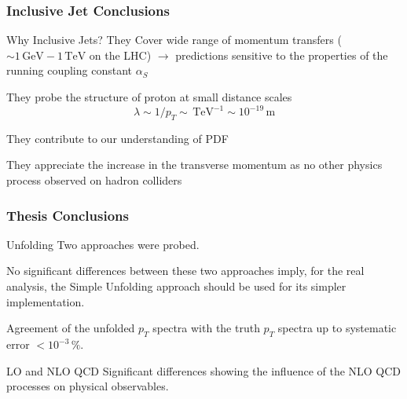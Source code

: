 \documentclass[compress]{beamer}
\newcommand{\GeV}{\,\text{GeV}}
\newcommand{\TeV}{\,\text{TeV}}
\newcommand{\pt}{p_{T}}
\begin{document}
\begin{frame}
\frametitle{Inclusive Jet Conclusions}
\begin{block}{Why Inclusive Jets?}
  They Cover wide range of momentum transfers ($\sim 1 \GeV - 1 \TeV$ on
  the LHC) $\rightarrow$ predictions sensitive to
  the properties of the running coupling constant $\alpha_S$

  They probe the structure of proton at small distance scales 
  \begin{equation*}
    \lambda \sim 1/\pt \sim \TeV^{-1} \sim 10^{-19}\,\text{m}
  \end{equation*}

  They contribute to our understanding of PDF

  They appreciate the increase in the transverse momentum as no other physics
  process observed on hadron colliders
\end{block}
\end{frame}

\begin{frame}
\frametitle{Thesis Conclusions}
\begin{block}{Unfolding}
  Two approaches were probed.
  
  No significant differences between these two approaches imply, for the real
  analysis, the Simple Unfolding approach should be used for its simpler
  implementation.

  Agreement of the unfolded $\pt$ spectra with the truth $\pt$ spectra up to
  systematic error $<10^{-3}\,\%$.
\end{block}
\begin{block}{LO and NLO QCD}
  Significant differences showing the influence of the NLO QCD processes on
  physical observables.
\end{block}
\end{frame}
\end{document}
